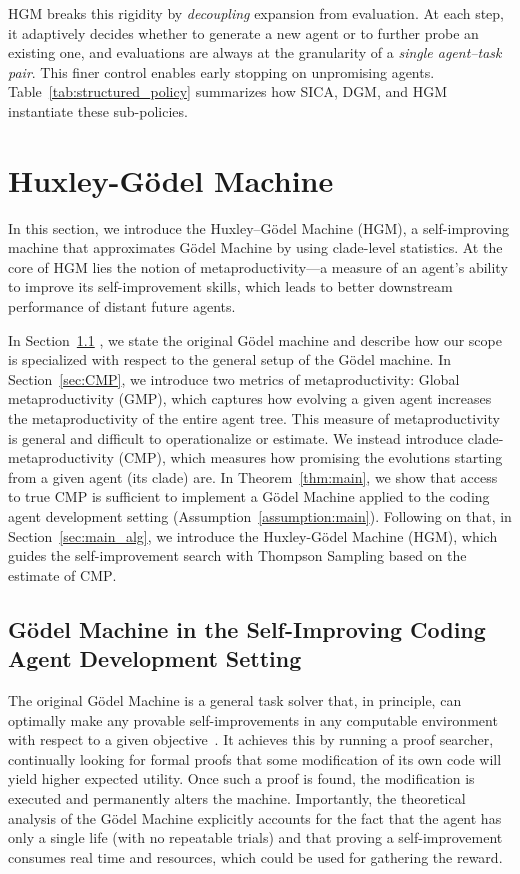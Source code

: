 \documentclass{article} %
\begin{document}
HGM breaks this rigidity by \emph{decoupling} expansion from evaluation. At each step, it adaptively decides whether to generate a new agent or to further probe an existing one, and evaluations are always at the granularity of a \emph{single agent–task pair}. This finer control enables early stopping on unpromising agents.
Table~\ref{tab:structured_policy} summarizes how SICA, DGM, and HGM instantiate these sub-policies. 







\section{Huxley-G\"odel Machine}\label{sec:method}
In this section, we introduce the Huxley–G\"odel Machine (HGM), 
a self-improving machine that approximates G\"odel Machine by using clade-level statistics. At the core of HGM lies the notion of metaproductivity—a measure of an agent's ability to improve its self-improvement skills, which leads to better downstream performance of distant future agents.

In Section~\ref{sec:GM_SICAD} , we state the original G\"odel machine and describe how our scope is specialized with respect to the general setup of the G\"odel machine. In Section~\ref{sec:CMP}, we introduce two metrics of metaproductivity: Global metaproductivity ($\mathrm{GMP}$), which captures how evolving a given agent increases the metaproductivity of the entire agent tree. This measure of metaproductivity is general and difficult to operationalize or estimate. We instead introduce clade-metaproductivity ($\mathrm{CMP}$), which measures how promising the evolutions starting from a given agent (its clade) are. In Theorem~\ref{thm:main}, we show that access to true $\mathrm{CMP}$ is sufficient to implement a G\"odel Machine applied to the coding agent development setting (Assumption~\ref{assumption:main}).
Following on that, in Section~\ref {sec:main_alg}, we introduce the Huxley-G\"odel Machine (HGM), which guides the self-improvement search with Thompson Sampling based on the estimate of $\mathrm{CMP}$. 

\subsection{G\"odel Machine in the Self-Improving Coding Agent Development Setting}\label{sec:GM_SICAD}
The original G\"odel Machine is a general task solver that, in principle, can optimally make any provable self-improvements in any computable environment with respect to a given objective~\citep{Schmidhuber:03gm}. It achieves this by running a proof searcher, continually looking for formal proofs that some modification of its own code will yield higher expected utility. Once such a proof is found, the modification is executed and permanently alters the machine. Importantly, the theoretical analysis of the G\"odel Machine explicitly accounts for the fact that the agent has only a single life (with no repeatable trials) and that proving a self-improvement consumes real time and resources, which could be used for gathering the reward.
\end{document}
